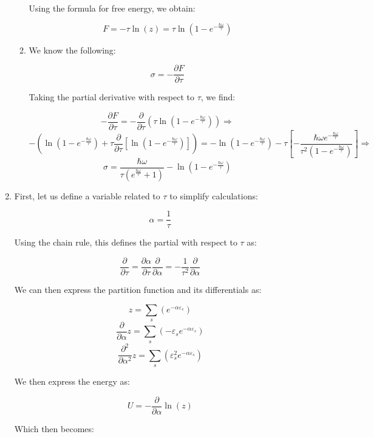 \begin{enumerate}
\begin{enumerate}
        Using the formula for free energy, we obtain:

        $$\boxed{F=-\tau\ln\left(  z\right)=\tau\ln\left(  1-e^{-\frac{\hbar\omega}{\tau}}\right)}$$

      \item 

        We know the following:

        $$\sigma=-\frac{\partial F}{\partial\tau}$$

        Taking the partial derivative with respect to $\tau$, we find:

        $$-\frac{\partial F}{\partial\tau}=-\frac{\partial}{\partial\tau}\left( \tau\ln\left( 1-e^{-\frac{\hbar\omega}{\tau}} \right) \right)\Rightarrow$$
        $$-\left(\ln\left( 1-e^{-\frac{\hbar\omega}{\tau}}\right) +\tau\frac{\partial}{\partial \tau}\left[\ln\left( 1-e^{-\frac{\hbar\omega}{\tau}} \right)\right]\right)=-\ln\left( 1-e^{-\frac{\hbar\omega}{\tau}}\right) -\tau\left[-\frac{\hbar\omega e^{-\frac{\hbar\omega}{\tau}}}{\tau^2\left(1-e^{-\frac{\hbar\omega}{\tau}}\right)}\right]\Rightarrow$$
        $$\boxed{\sigma=\frac{\hbar\omega}{\tau\left(e^{\frac{\hbar\omega}{\tau}}+1\right)}-\ln\left( 1-e^{-\frac{\hbar\omega}{\tau}}\right)}$$

    \end{enumerate}

  \item

    First, let us define a variable related to $\tau$ to simplify calculations:

    $$\alpha=\frac{1}{\tau}$$

    Using the chain rule, this defines the partial with respect to $\tau$ as:

    $$\frac{\partial}{\partial\tau}=\frac{\partial\alpha}{\partial\tau}\frac{\partial}{\partial\alpha}=-\frac{1}{\tau^2}\frac{\partial}{\partial\alpha}$$

    We can then express the partition function and its differentials as:

    $$z=\sum_s\left( e^{-\alpha\varepsilon_s} \right)$$
    $$\frac{\partial}{\partial\alpha} z=\sum_s\left( -\varepsilon_se^{-\alpha\varepsilon_s} \right)$$
    $$\frac{\partial^2}{\partial\alpha^2} z=\sum_s\left( \varepsilon_s^2e^{-\alpha\varepsilon_s} \right)$$

    We then express the energy as:

    $$U=-\frac{\partial}{\partial\alpha}\ln(z)$$

    Which then becomes:


\end{enumerate}
